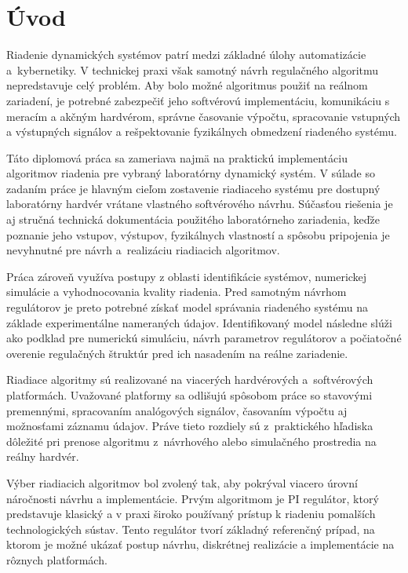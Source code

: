 \section*{Úvod}

Riadenie dynamických systémov patrí medzi základné úlohy automatizácie a~kybernetiky. V technickej praxi však samotný návrh regulačného algoritmu
nepredstavuje celý problém. Aby bolo možné algoritmus použiť na reálnom
zariadení, je potrebné zabezpečiť jeho softvérovú implementáciu, komunikáciu
s meracím a akčným hardvérom, správne časovanie výpočtu, spracovanie vstupných
a výstupných signálov a rešpektovanie fyzikálnych obmedzení riadeného systému.

Táto diplomová práca sa zameriava najmä na praktickú implementáciu algoritmov
riadenia pre vybraný laboratórny dynamický systém. V súlade so zadaním práce je
hlavným cieľom zostavenie riadiaceho systému pre dostupný laboratórny hardvér
vrátane vlastného softvérového návrhu. Súčasťou riešenia je aj stručná technická
dokumentácia použitého laboratórneho zariadenia, keďže poznanie jeho vstupov,
výstupov, fyzikálnych vlastností a spôsobu pripojenia je nevyhnutné pre návrh
a~realizáciu riadiacich algoritmov.

Práca zároveň využíva postupy z oblasti identifikácie systémov, numerickej
simulácie a vyhodnocovania kvality riadenia. Pred samotným návrhom regulátorov
je preto potrebné získať model správania riadeného systému na základe
experimentálne nameraných údajov. Identifikovaný model následne slúži ako
podklad pre numerickú simuláciu, návrh parametrov regulátorov a počiatočné
overenie regulačných štruktúr pred ich nasadením na reálne zariadenie.

Riadiace algoritmy sú realizované na viacerých hardvérových a~softvérových
platformách. Uvažované platformy sa odlišujú spôsobom práce so stavovými
premennými, spracovaním analógových signálov, časovaním výpočtu aj možnosťami
záznamu údajov. Práve tieto rozdiely sú z~praktického hľadiska dôležité pri
prenose algoritmu z~návrhového alebo simulačného prostredia na reálny hardvér.

Výber riadiacich algoritmov bol zvolený tak, aby pokrýval viacero úrovní
náročnosti návrhu a implementácie. Prvým algoritmom je PI regulátor, ktorý
predstavuje klasický a v praxi široko používaný prístup k riadeniu pomalších
technologických sústav. Tento regulátor tvorí základný referenčný prípad, na
ktorom je možné ukázať postup návrhu, diskrétnej realizácie a implementácie
na rôznych platformách.

